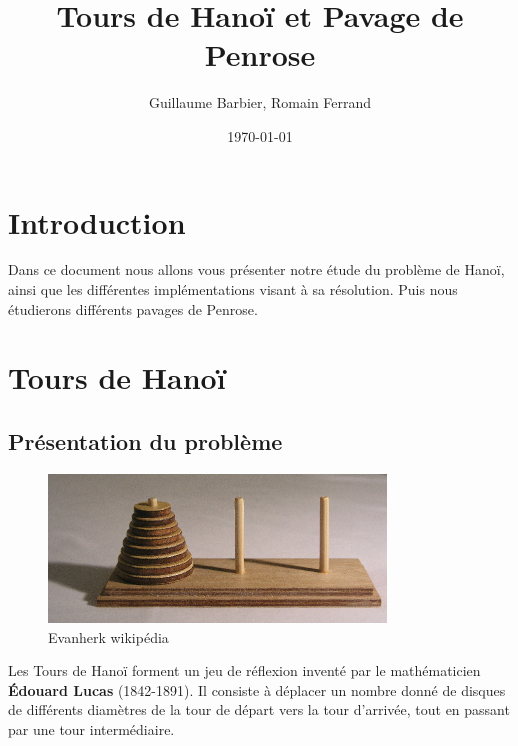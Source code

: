 \documentclass[a4paper,11pt]{article}
\begin{document}
\begin{titlepage}
  \title{Tours de Hanoï et Pavage de Penrose}
  \author{Guillaume Barbier, Romain Ferrand}
  \date{\today}

  \maketitle

  \begin{abstract}
    
  \end{abstract}
\end{titlepage}

\section*{Introduction}
\begin{center}
	Dans ce document nous allons vous présenter notre étude du problème de Hanoï,
    ainsi que les différentes implémentations visant à sa résolution.
    Puis nous étudierons différents pavages de Penrose.
\end{center}

\section{Tours de Hanoï}
\label{chap:hanoi}

\subsection{Présentation du problème}
\label{sec:prezHanoi}
\begin{figure}
  \centering
  \includegraphics[width=0.8\textwidth]{Tower_of_Hanoi.jpeg}
  \caption{Evanherk wikipédia}
  \label{fig:hanoi}
\end{figure}

Les Tours de Hanoï forment un jeu de réflexion inventé par le mathématicien \textbf{Édouard Lucas} (1842-1891).
Il consiste à déplacer un nombre donné de disques de différents diamètres de la tour de départ vers la tour d'arrivée,
tout en passant par une tour intermédiaire.
\end{document}
